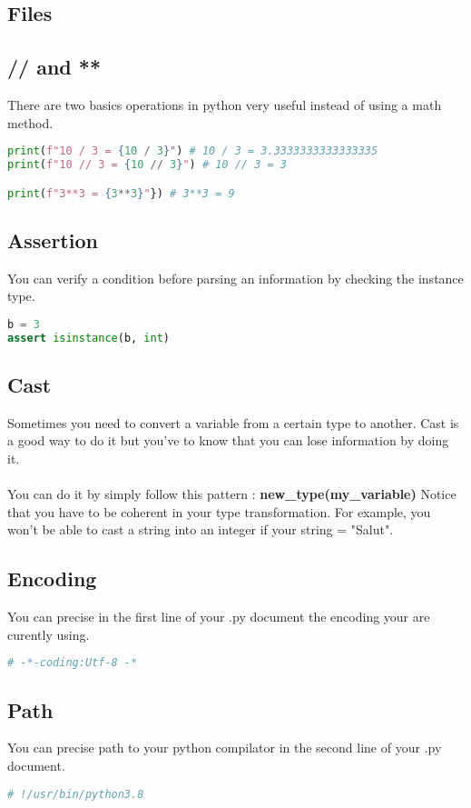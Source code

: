 \documentclass[a4paper, 12pt, titlepage]{scrartcl} %
\begin{document}
\subsection{Files}

\subsection{// and **}
There are two basics operations in python very useful instead of using a math method.
\begin{lstlisting}[language=Python]
print(f"10 / 3 = {10 / 3}") # 10 / 3 = 3.3333333333333335
print(f"10 // 3 = {10 // 3}") # 10 // 3 = 3

print(f"3**3 = {3**3}"}) # 3**3 = 9
\end{lstlisting}

\subsection{Assertion}
\label{subsec:Assertion}
You can verify a condition before parsing an information by checking the instance type.
\begin{lstlisting}[language=Python]
b = 3
assert isinstance(b, int)
\end{lstlisting}

\subsection{Cast}
Sometimes you need to convert a variable from a certain type to another. Cast is a good way to do it but you've to know that you can lose information by doing it. \\ \\
You can do it by simply follow this pattern : \textbf{new\_type(my\_variable)}
Notice that you have to be coherent in your type transformation. For example, you won't be able to cast a string into an integer if your string = "Salut".

\subsection{Encoding}
You can precise in the first line of your .py document the encoding your are curently using.
\begin{lstlisting}[language=Python]
# -*-coding:Utf-8 -*
\end{lstlisting}

\subsection{Path}
You can precise path to your python compilator in the second line of your .py document.
\begin{lstlisting}[language=Python]
# !/usr/bin/python3.8
\end{lstlisting}
\end{document}
